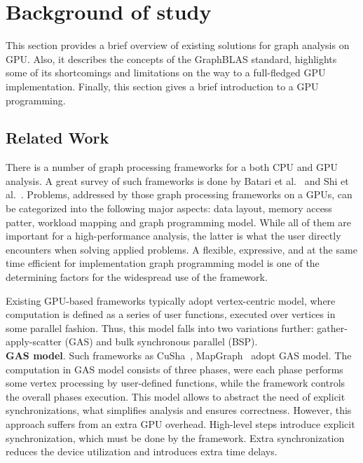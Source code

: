 \section{Background of study}

This section provides a brief overview of existing solutions for graph analysis on GPU. Also, it describes the concepts of the GraphBLAS standard, highlights some of its shortcomings and limitations on the way to a full-fledged GPU implementation. Finally, this section gives a brief introduction to a GPU programming.

\subsection{Related Work}

There is a number of graph processing frameworks for a both CPU and GPU analysis. A great survey of such frameworks is done by Batari et al.~\cite{article:batarfi_survey_graphs} and Shi et al.~\cite{article:shi_survey_graphs}. Problems, addressed by those graph processing frameworks on a GPUs, can be categorized into the following major aspects: data layout, memory access patter, workload mapping and graph programming model. While all of them are important for a high-performance analysis, the latter is what the user directly encounters when solving applied problems. A flexible, expressive, and at the same time efficient for implementation graph programming model is one of the determining factors for the widespread use of the framework.

Existing GPU-based frameworks typically adopt vertex-centric model, where computation is defined as a series of user functions, executed over vertices in some parallel fashion. Thus, this model falls into two variations further: gather-apply-scatter (GAS) and bulk synchronous parallel (BSP).\\

\textbf{GAS model}. Such frameworks as CuSha~\cite{article:cusha}, MapGraph~\cite{article:MapGraph} adopt GAS model. The computation in GAS model consists of three phases, were each phase performs some vertex processing by user-defined functions, while the framework controls the overall phases execution. This model allows to abstract the need of explicit synchronizations, what simplifies analysis and ensures correctness. However, this approach suffers from an extra GPU overhead. High-level steps introduce explicit synchronization, which must be done by the framework. Extra synchronization reduces the device utilization and introduces extra time delays.\\

